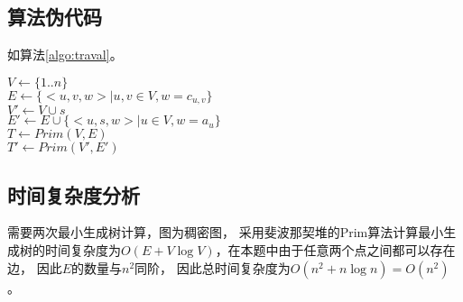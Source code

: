 \subsection{算法伪代码}
如算法\ref{algo:traval}。

\begin{algorithm}[H]
    \caption{$traval(c[1..n][1..n], a[1..n])$}\label{algo:traval}
    $V \leftarrow \{1..n\}$\\
    $E \leftarrow \{<u,v,w> | u,v \in V, w = c_{u,v}\}$\\
    $V' \leftarrow V \cup s$\\
    $E' \leftarrow E \cup \{<u, s, w> | u \in V, w = a_u \}$\\
    $T \leftarrow Prim(V,E)$\\
    $T' \leftarrow Prim(V', E')$\\
\end{algorithm}

\subsection{时间复杂度分析}
需要两次最小生成树计算，图为稠密图，
采用斐波那契堆的Prim算法计算最小生成树的时间复杂度为$O(E + V \log V)$，在本题中由于任意两个点之间都可以存在边，
因此$E$的数量与$n^2$同阶， 因此总时间复杂度为$O(n^2 + n \log n) = O(n ^ 2)$。
